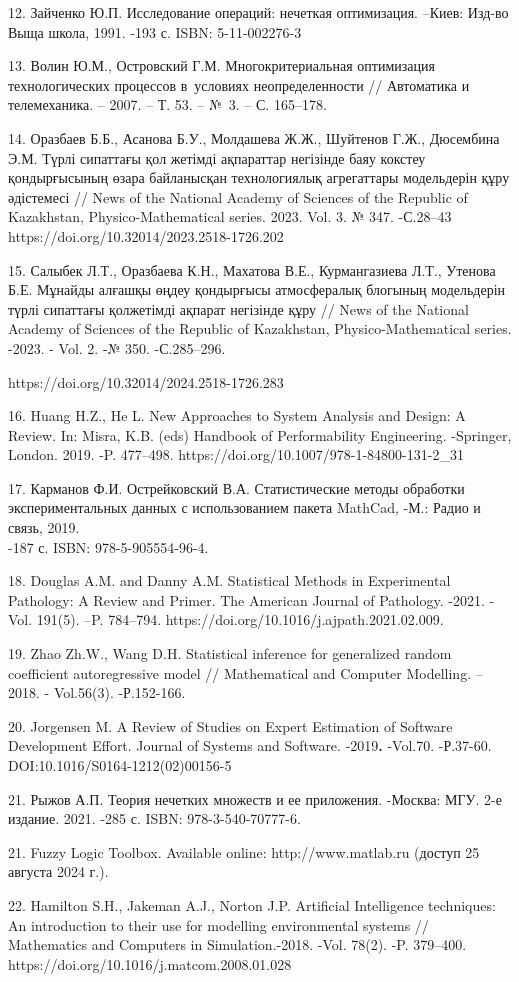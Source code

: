 \begin{noparindent}
12. Зайченко Ю.П. Исследование операций: нечеткая оптимизация. --Киев:
Изд-во Выща школа, 1991. -193 с. ISBN: 5-11-002276-3

13. Волин Ю.М., Островский Г.М. Многокритериальная оптимизация
технологических процессов в~условиях неопределенности // Автоматика и
телемеханика. -- 2007. -- Т. 53. -- №~3. -- С. 165--178.

14. Оразбаев Б.Б., Асанова Б.У., Молдашева Ж.Ж., Шуйтенов Г.Ж.,
Дюсембина Э.М. Түрлі сипаттағы қол жетімді ақпараттар негізінде баяу
кокстеу қондырғысының өзара байланысқан технологиялық агрегаттары
модельдерін құру әдістемесі // News of the National Academy of Sciences
of the Republic of Kazakhstan, Physico-Mathematical series. 2023. Vol.
3. № 347. -С.28--43 https://doi.org/10.32014/2023.2518-1726.202

15. Салыбек Л.Т., Оразбаева К.Н., Махатова В.Е., Курмангазиева Л.Т.,
Утенова Б.Е. Мұнайды алғашқы өңдеу қондырғысы атмосфералық блогының
модельдерін түрлі сипаттағы қолжетімді ақпарат негізінде құру // News of
the National Academy of Sciences of the Republic of Kazakhstan,
Physico-Mathematical series. -2023. - Vol. 2. -№ 350. -С.285--296.

https://doi.org/10.32014/2024.2518-1726.283

16. Huang H.Z., He L. New Approaches to System Analysis and Design: A
Review. In: Misra, K.B. (eds) Handbook of Performability Engineering.
-Springer, London. 2019. -P. 477--498.
https://doi.org/10.1007/978-1-84800-131-2\_31

17. Карманов Ф.И. Острейковский В.А. Статистические методы обработки
экспериментальных данных с использованием пакета MathCad, -М.: Радио и
связь, 2019.\\
-187 с. ISBN: 978-5-905554-96-4.

18. Douglas A.M. and Danny A.M. Statistical Methods in Experimental
Pathology: A Review and Primer. The American Journal of Pathology.
-2021. -Vol. 191(5). --P. 784--794.
https://doi.org/10.1016/j.ajpath.2021.02.009.

19. Zhao Zh.W., Wang D.H. Statistical inference for generalized random
coefficient autoregressive model // Mathematical and Computer Modelling.
-- 2018. - Vol.56(3). -Р.152-166.

20. Jorgensen M. A Review of Studies on Expert Estimation of Software
Development Effort. Journal of Systems and Software. -2019{\bfseries .}
-Vol.70. -Р.37-60. DOI:10.1016/S0164-1212(02)00156-5

21. Рыжов А.П. Теория нечетких множеств и ее приложения. -Москва: МГУ.
2-е издание. 2021. -285 с. ISBN: 978-3-540-70777-6.

21. Fuzzy Logic Toolbox. Available online: http://www.matlab.ru (доступ
25 августа 2024 г.).

22. Hamilton S.H., Jakeman A.J., Norton J.P. Artificial Intelligence
techniques: An introduction to their use for modelling environmental
systems // Mathematics and Computers in Simulation.-2018. -Vol. 78(2).
-P. 379--400. https://doi.org/10.1016/j.matcom.2008.01.028

\end{noparindent}

